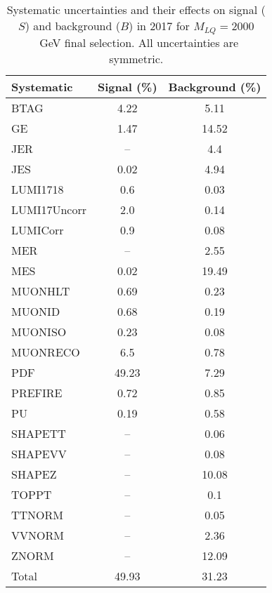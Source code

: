 \begin{table}[htbp]
\begin{center}
\caption{Systematic uncertainties and their effects on signal ($S$) and background ($B$) in 2017 for $M_{LQ}=2000$~GeV final selection. All uncertainties are symmetric.}
\begin{tabular}{lcc}
\hline\hline
Systematic & Signal (\%) & Background (\%) \\ \hline 
BTAG & 4.22 & 5.11\\ 
GE & 1.47 & 14.52\\ 
JER & -- & 4.4\\ 
JES & 0.02 & 4.94\\ 
LUMI1718 & 0.6 & 0.03\\ 
LUMI17Uncorr & 2.0 & 0.14\\ 
LUMICorr & 0.9 & 0.08\\ 
MER & -- & 2.55\\ 
MES & 0.02 & 19.49\\ 
MUONHLT & 0.69 & 0.23\\ 
MUONID & 0.68 & 0.19\\ 
MUONISO & 0.23 & 0.08\\ 
MUONRECO & 6.5 & 0.78\\ 
PDF & 49.23 & 7.29\\ 
PREFIRE & 0.72 & 0.85\\ 
PU & 0.19 & 0.58\\ 
SHAPETT & -- & 0.06\\ 
SHAPEVV & -- & 0.08\\ 
SHAPEZ & -- & 10.08\\ 
TOPPT & -- & 0.1\\ 
TTNORM & -- & 0.05\\ 
VVNORM & -- & 2.36\\ 
ZNORM & -- & 12.09\\ 
Total & 49.93 & 31.23\\ \hline \hline
\end{tabular}
\label{tab:SysUncertainties_uujj_2000}
\end{center}
\end{table}


